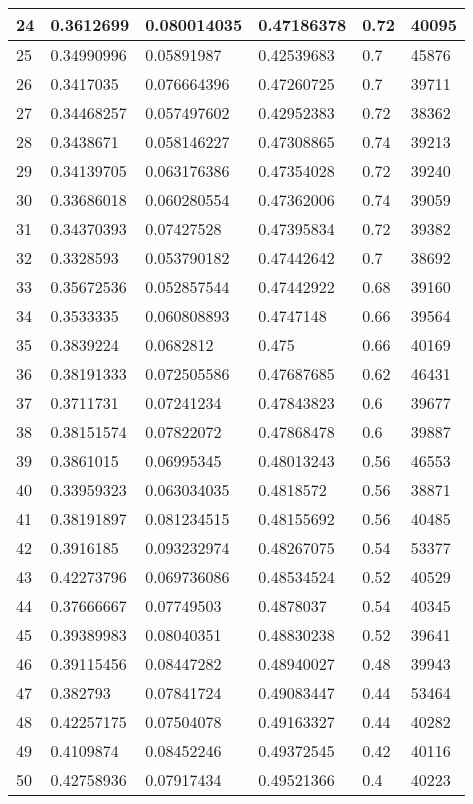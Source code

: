 \begin{longtable}{|l|l|l|l|l|l|}
24 & 0.3612699 & 0.080014035 & 0.47186378 & 0.72 & 40095 \\ \hline 
25 & 0.34990996 & 0.05891987 & 0.42539683 & 0.7 & 45876 \\ \hline 
26 & 0.3417035 & 0.076664396 & 0.47260725 & 0.7 & 39711 \\ \hline 
27 & 0.34468257 & 0.057497602 & 0.42952383 & 0.72 & 38362 \\ \hline 
28 & 0.3438671 & 0.058146227 & 0.47308865 & 0.74 & 39213 \\ \hline 
29 & 0.34139705 & 0.063176386 & 0.47354028 & 0.72 & 39240 \\ \hline 
30 & 0.33686018 & 0.060280554 & 0.47362006 & 0.74 & 39059 \\ \hline 
31 & 0.34370393 & 0.07427528 & 0.47395834 & 0.72 & 39382 \\ \hline 
32 & 0.3328593 & 0.053790182 & 0.47442642 & 0.7 & 38692 \\ \hline 
33 & 0.35672536 & 0.052857544 & 0.47442922 & 0.68 & 39160 \\ \hline 
34 & 0.3533335 & 0.060808893 & 0.4747148 & 0.66 & 39564 \\ \hline 
35 & 0.3839224 & 0.0682812 & 0.475 & 0.66 & 40169 \\ \hline 
36 & 0.38191333 & 0.072505586 & 0.47687685 & 0.62 & 46431 \\ \hline 
37 & 0.3711731 & 0.07241234 & 0.47843823 & 0.6 & 39677 \\ \hline 
38 & 0.38151574 & 0.07822072 & 0.47868478 & 0.6 & 39887 \\ \hline 
39 & 0.3861015 & 0.06995345 & 0.48013243 & 0.56 & 46553 \\ \hline 
40 & 0.33959323 & 0.063034035 & 0.4818572 & 0.56 & 38871 \\ \hline 
41 & 0.38191897 & 0.081234515 & 0.48155692 & 0.56 & 40485 \\ \hline 
42 & 0.3916185 & 0.093232974 & 0.48267075 & 0.54 & 53377 \\ \hline 
43 & 0.42273796 & 0.069736086 & 0.48534524 & 0.52 & 40529 \\ \hline 
44 & 0.37666667 & 0.07749503 & 0.4878037 & 0.54 & 40345 \\ \hline 
45 & 0.39389983 & 0.08040351 & 0.48830238 & 0.52 & 39641 \\ \hline 
46 & 0.39115456 & 0.08447282 & 0.48940027 & 0.48 & 39943 \\ \hline 
47 & 0.382793 & 0.07841724 & 0.49083447 & 0.44 & 53464 \\ \hline 
48 & 0.42257175 & 0.07504078 & 0.49163327 & 0.44 & 40282 \\ \hline 
49 & 0.4109874 & 0.08452246 & 0.49372545 & 0.42 & 40116 \\ \hline 
50 & 0.42758936 & 0.07917434 & 0.49521366 & 0.4 & 40223 \\ \hline 
\end{longtable}